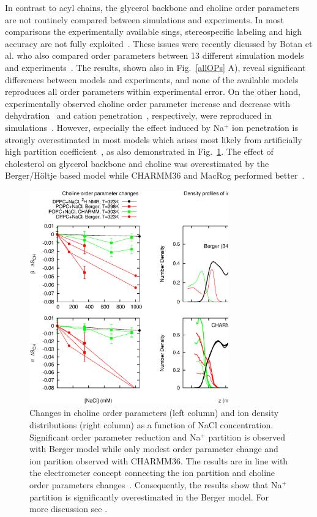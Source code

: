 \documentclass[aps,prl,superscriptaddress,twocolumn]{revtex4}
\begin{document}
In contrast to acyl chains, the glycerol backbone and choline order parameters are not routinely
compared between simulations and experiments. In most comparisons the experimentally available sings,
stereospecific labeling and high accuracy are not fully exploited~\cite{shinoda97,hogberg06,klauda10,poger12,dickson12,botan15,hogberg08,kapla12}.
These issues were recently dicussed by Botan et al. who also compared order parameters 
between 13 different simulation models and experiments~\cite{botan15}. The results, shown also in Fig.~\ref{allOPs} A),
reveal significant differences between models and experiments, and none of the available models
reproduces all order parameters within experimental error.
On the other hand, experimentally observed choline order parameter increase and decrease with 
dehydration~\cite{bechinger91,ulrich94,dvinskikh05b} and cation penetration~\cite{akutsu81,altenbach84}, 
respectively, were reproduced in simulations~\cite{botan15,ionpaper}.
However, especially the effect induced by Na$^+$ ion penetration is strongly overestimated
in most models which arises most likely from artificially high partition coefficient~\cite{ionpaper},
as also demonstrated in Fig.~\ref{changesDUEna}.
The effect of cholesterol on glycerol backbone and choline was overestimated
by the Berger/H{\"o}ltje based model while CHARMM36 and MacRog performed better~\cite{botan15}. 
\begin{figure}[]
  \includegraphics[width=8.6cm]{../Fig/changesDUEna.eps}
\newline
  \caption{\label{changesDUEna}
    Changes in choline order parameters (left column) and ion density distributions (right column)
    as a function of NaCl concentration. Significant order parameter
    reduction and Na$^+$ partition is observed with Berger model while only modest order parameter change
    and ion parition observed with CHARMM36. The results are in line with the electrometer concept
    connecting the ion partition and choline order parameters changes~\cite{akutsu81,altenbach84,seelig87,scherer89}.
    Consequently, the results show that Na$^+$ partition is significantly overestimated in the Berger model. 
    For more discussion see \cite{ionpaper}.
  } 
\end{figure}
\end{document}
